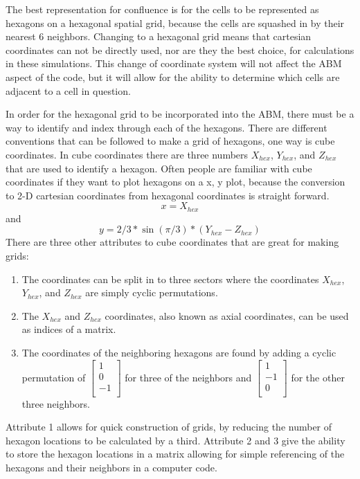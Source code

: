 \documentclass[a4paper]{article}
\begin{document}
The best representation for confluence is for the cells to be represented as hexagons on a hexagonal spatial grid, because the cells are squashed in by their nearest 6 neighbors. Changing to a hexagonal grid means that cartesian coordinates can not be directly used, nor are they the best choice, for calculations in these simulations. This change of coordinate system will not affect the ABM aspect of the code, but it will allow for the ability to determine which cells are adjacent to a cell in question. 

In order for the hexagonal grid to be incorporated into the ABM, there must be a way to identify and index through each of the hexagons. There are different conventions that can be followed to make a grid of hexagons, one way is cube coordinates. In cube coordinates there are three numbers $X_{hex}$, $Y_{hex}$, and $Z_{hex}$ that are used to identify a hexagon. Often people are familiar with cube coordinates if they want to plot hexagons on a x, y plot, because the conversion to 2-D cartesian coordinates from hexagonal coordinates is straight forward. $$x = X_{hex}$$ and $$y = 2/3*\sin(\pi/3)*\left ( Y_{hex}-Z_{hex} \right )$$ There are three other attributes to cube coordinates that are great for making grids:
\begin{enumerate} 
    \item The coordinates can be split in to three sectors where the coordinates $X_{hex}$, $Y_{hex}$, and $Z_{hex}$ are simply cyclic permutations.
    \item The $X_{hex}$ and $Z_{hex}$ coordinates, also known as axial coordinates, can be used as indices of a matrix.
    \item  The coordinates of the neighboring hexagons are found by adding a cyclic permutation of 
        $\left [
            \begin{array}{c}
                1 \\
                0 \\
                -1\\
            \end{array}
        \right ]$
        for three of the neighbors and
        $\left [ 
            \begin{array}{c}
                1 \\
                -1 \\
                0\\
            \end{array}
        \right ]$
        for the other three neighbors.
\end{enumerate}
Attribute 1 allows for quick construction of grids, by reducing the number of hexagon locations to be calculated by a third. Attribute 2 and 3 give the ability to store the hexagon locations in a matrix allowing for simple referencing of the hexagons and their neighbors in a computer code. 
\end{document}
